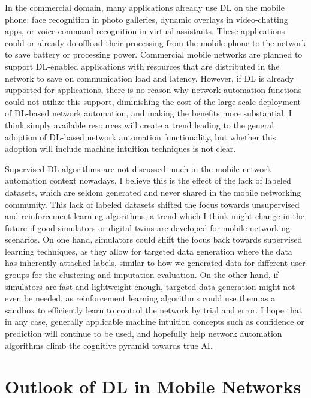 			In the commercial domain, many applications already use \ac{DL} on the mobile phone: face recognition in photo galleries, dynamic overlays in video-chatting apps, or voice command recognition in virtual assistants.
			These applications could or already do offload their processing from the mobile phone to the network to save battery or processing power.
			Commercial mobile networks are planned to support \ac{DL}-enabled applications with resources that are distributed in the network to save on communication load and latency.
			However, if \ac{DL} is already supported for applications, there is no reason why network automation functions could not utilize this support, diminishing the cost of the large-scale deployment of \ac{DL}-based network automation, and making the benefits more substantial.
			I think simply available resources will create a trend leading to the general adoption of \ac{DL}-based network automation functionality, but whether this adoption will include machine intuition techniques is not clear.
			
			Supervised \ac{DL} algorithms are not discussed much in the mobile network automation context nowadays.
			I believe this is the effect of the lack of labeled datasets, which are seldom generated and never shared in the mobile networking community.
			This lack of labeled datasets shifted the focus towards unsupervised and reinforcement learning algorithms, a trend which I think might change in the future if good simulators or digital twins are developed for mobile networking scenarios.
			On one hand, simulators could shift the focus back towards supervised learning techniques, as they allow for targeted data generation where the data has inherently attached labels, similar to how we generated data for different user groups for the clustering and imputation evaluation.
			On the other hand, if simulators are fast and lightweight enough, targeted data generation might not even be needed, as reinforcement learning algorithms could use them as a sandbox to efficiently learn to control the network by trial and error.
			I hope that in any case, generally applicable machine intuition concepts such as confidence or prediction will continue to be used, and hopefully help network automation algorithms climb the cognitive pyramid towards true \ac{AI}.

	\section{Outlook of DL in Mobile Networks}
	
